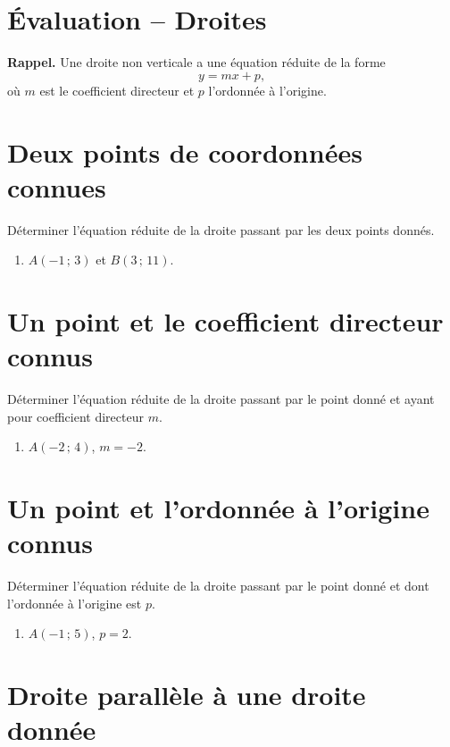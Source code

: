 \documentclass[12pt,a4paper]{article}
\begin{document}
	
	\section*{Évaluation -- Droites}
	
	\textbf{Rappel.} Une droite non verticale a une équation réduite de la forme
	\[
	y = mx + p,
	\]
	où \(m\) est le coefficient directeur et \(p\) l’ordonnée à l’origine.
	
	\section{Deux points de coordonnées connues}
	
	Déterminer l’équation réduite de la droite passant par les deux points donnés.
	
	\begin{enumerate}
		\item \(A(-1\,;\,3)\) et \(B(3\,;\,11)\).
	\end{enumerate}
	
	\section{Un point et le coefficient directeur connus}
	
	Déterminer l’équation réduite de la droite passant par le point donné et ayant pour coefficient directeur \(m\).
	
	\begin{enumerate}
		\item \(A(-2\,;\,4)\), \(m = -2\).
	\end{enumerate}
	
	\section{Un point et l’ordonnée à l’origine connus}
	
	Déterminer l’équation réduite de la droite passant par le point donné et dont l’ordonnée à l’origine est \(p\).
	
	\begin{enumerate}
		\item \(A(-1\,;\,5)\), \(p = 2\).
	\end{enumerate}
	
	\section{Droite parallèle à une droite donnée}
	
\end{document}
